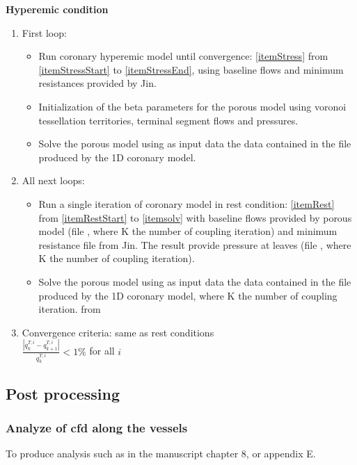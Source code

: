\documentclass[a4paper, 11pt]{article} %
\begin{document}
\textbf{Hyperemic condition}\\
\begin{enumerate}[label=(\roman*)]
\item First loop:
\begin{itemize}
\item Run coronary hyperemic model until convergence: \ref{itemStress} from \ref{itemStressStart} to \ref{itemStressEnd}, using baseline flows and minimum resistances provided by Jin.
\item Initialization of the beta parameters for the porous model using voronoi tessellation territories, terminal segment flows and pressures.
\item Solve the porous model using as input data the data contained in the  file produced by the 1D coronary model.
\end{itemize}
\item All next loops:
\begin{itemize}
\item Run a single iteration of coronary model in rest condition:  \ref{itemRest} from \ref{itemRestStart} to \ref{itemsolv} with baseline flows provided by porous model (file , where K the number of coupling iteration) and minimum resistance file from Jin. The result provide pressure at leaves (file , where K the number of coupling iteration).
\item Solve the porous model using as input data the data contained in the  file produced by the 1D coronary model, where K the number of coupling iteration.
 from \end{itemize}
\item Convergence criteria: same as rest conditions\\
$\frac{\left\lvert q^{T,i}_{k} - q^{T,i}_{k+1} \right\rvert}{q^{T,i}_k} < 1 \%$ for all $i$

\end{enumerate}




\subsection{Post processing}

\subsubsection{Analyze of cfd along the vessels}
To produce analysis such as in the manuscript chapter 8, or appendix E.
\end{document}
